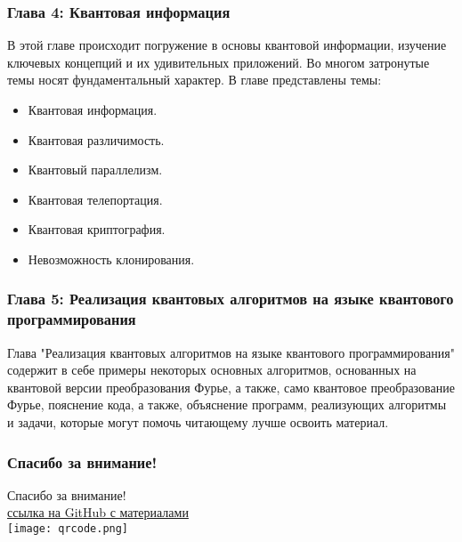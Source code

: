 \documentclass{beamer}
\begin{document}
	\begin{frame}\frametitle{Глава 4: Квантовая информация}
		\justifying
		В этой главе происходит погружение в основы квантовой информации, изучение ключевых концепций и их удивительных приложений. Во многом затронутые темы носят фундаментальный характер. В главе представлены темы:
		\begin{itemize}
			\item \justifying Квантовая информация.
			\item \justifying Квантовая различимость.
			\item \justifying Квантовый параллелизм.
			\item \justifying Квантовая телепортация.
			\item \justifying Квантовая криптография.
			\item \justifying Невозможность клонирования.
		\end{itemize}
	\end{frame}
	
	
	\begin{frame}\frametitle{Глава 5: Реализация квантовых алгоритмов на языке квантового программирования }
		\justifying Глава "Реализация квантовых алгоритмов на языке квантового программирования" содержит в себе примеры некоторых основных алгоритмов, основанных на квантовой версии преобразования Фурье, а также, само квантовое преобразование Фурье, пояснение кода, а также, объяснение программ, реализующих алгоритмы и задачи, которые могут помочь читающему лучше освоить материал.
	\end{frame}
	
	\begin{frame}
		\frametitle{Спасибо за внимание!}
		\begin{center}
			\Large Спасибо за внимание! \\
			\vspace{1cm}
			\href{https://github.com/Lanuis-1/Educational-and-methodical-manual.git}{ссылка на GitHub с материалами} \\
			\vspace{0.5cm}
			\texttt{[image: qrcode.png]}
		\end{center}
	\end{frame}
\end{document}
